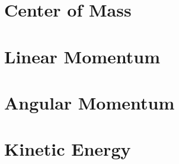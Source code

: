 \documentclass[class=report, 12pt, crop=false]{standalone}
\begin{document}
\begin{center}
\section{Center of Mass}
\begin{comment}
\end{comment}
\section{Linear Momentum}
\begin{comment}
\end{comment}
\section{Angular Momentum}
\begin{comment}
\end{comment}
\section{Kinetic Energy}
\begin{comment}
\end{comment}
\end{center}
\end{document}
